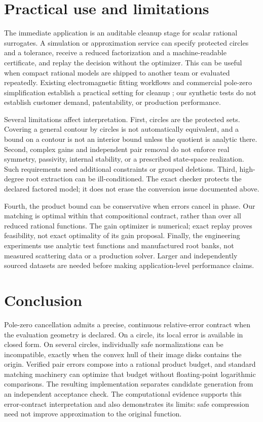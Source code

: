 \documentclass[11pt]{article}
\theoremstyle{definition}\newtheorem{definition}[theorem]{Definition}
\begin{document}
\section{Practical use and limitations}
The immediate application is an auditable cleanup stage for scalar rational surrogates. A simulation or approximation service can specify protected circles and a tolerance, receive a reduced factorization and a machine-readable certificate, and replay the decision without the optimizer. This can be useful when compact rational models are shipped to another team or evaluated repeatedly. Existing electromagnetic fitting workflows and commercial pole-zero simplification establish a practical setting for cleanup \cite{yuan,minreal}; our synthetic tests do not establish customer demand, patentability, or production performance.

Several limitations affect interpretation. First, circles are the protected sets. Covering a general contour by circles is not automatically equivalent, and a bound on a contour is not an interior bound unless the quotient is analytic there. Second, complex gains and independent pair removal do not enforce real symmetry, passivity, internal stability, or a prescribed state-space realization. Such requirements need additional constraints or grouped deletions. Third, high-degree root extraction can be ill-conditioned. The exact checker protects the declared factored model; it does not erase the conversion issue documented above.

Fourth, the product bound can be conservative when errors cancel in phase. Our matching is optimal within that compositional contract, rather than over all reduced rational functions. The gain optimizer is numerical; exact replay proves feasibility, not exact optimality of its gain proposal. Finally, the engineering experiments use analytic test functions and manufactured root banks, not measured scattering data or a production solver. Larger and independently sourced datasets are needed before making application-level performance claims.

\section{Conclusion}
Pole-zero cancellation admits a precise, continuous relative-error contract when the evaluation geometry is declared. On a circle, its local error is available in closed form. On several circles, individually safe normalizations can be incompatible, exactly when the convex hull of their image disks contains the origin. Verified pair errors compose into a rational product budget, and standard matching machinery can optimize that budget without floating-point logarithmic comparisons. The resulting implementation separates candidate generation from an independent acceptance check. The computational evidence supports this error-contract interpretation and also demonstrates its limits: safe compression need not improve approximation to the original function.
\end{document}
